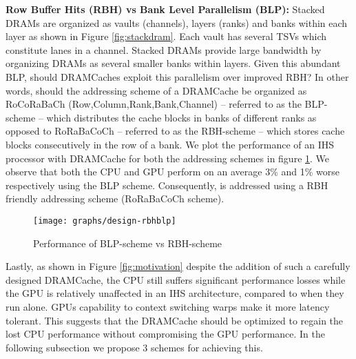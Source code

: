 \par \textbf{Row Buffer Hits (RBH) vs Bank Level Parallelism (BLP):} Stacked DRAMs are organized as vaults (channels), layers (ranks) and banks within each layer as shown in Figure \ref{fig:stackdram}. Each vault has several TSVs which constitute lanes in a channel. Stacked DRAMs provide large bandwidth by organizing DRAMs as several smaller banks within layers. Given this abundant BLP, should DRAMCaches exploit this parallelism over improved RBH? In other words, should the addressing scheme of a DRAMCache be organized as RoCoRaBaCh (Row,Column,Rank,Bank,Channel) -- referred to as the BLP-scheme -- which distributes the cache blocks in banks of different ranks as opposed to RoRaBaCoCh -- referred to as the RBH-scheme -- which stores cache blocks consecutively in the row of a bank. We plot the performance of an IHS processor with DRAMCache for both the addressing schemes in figure \ref{fig:design-rbhblp}. We observe that both the CPU and GPU perform on an average 3\% and 1\% worse respectively using the BLP scheme. Consequently, \cachename is addressed using a RBH friendly addressing scheme (RoRaBaCoCh scheme). 

\begin{figure}[htbp]
   \texttt{[image: graphs/design-rbhblp]}
   \caption{Performance of BLP-scheme vs RBH-scheme}
   \label{fig:design-rbhblp}
\end{figure}

\par Lastly, as shown in Figure \ref{fig:motivation} despite the addition of such a carefully designed DRAMCache, the CPU still suffers significant performance losses while the GPU is relatively unaffected in an IHS architecture, compared to when they run alone. GPUs capability to context switching warps make it more latency tolerant. This suggests that the DRAMCache should be optimized to regain the lost CPU performance without compromising the GPU performance.  In the following subsection we propose 3 schemes for achieving this. 